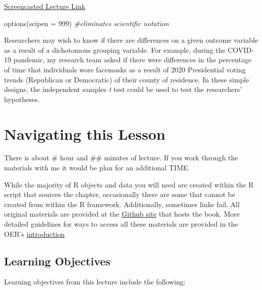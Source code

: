 \documentclass[
  11pt,
]{book}
\newenvironment{Shaded}{\begin{snugshade}}{\end{snugshade}}
\newcommand{\AttributeTok}[1]{\textcolor[rgb]{0.77,0.63,0.00}{#1}}
\newcommand{\CommentTok}[1]{\textcolor[rgb]{0.56,0.35,0.01}{\textit{#1}}}
\newcommand{\DecValTok}[1]{\textcolor[rgb]{0.00,0.00,0.81}{#1}}
\newcommand{\FunctionTok}[1]{\textcolor[rgb]{0.00,0.00,0.00}{#1}}
\newcommand{\NormalTok}[1]{#1}
\begin{document}
\href{link\%20here}{Screencasted Lecture Link}

\begin{Shaded}
\begin{Highlighting}[]
\FunctionTok{options}\NormalTok{(}\AttributeTok{scipen =} \DecValTok{999}\NormalTok{)  }\CommentTok{\#eliminates scientific notation}
\end{Highlighting}
\end{Shaded}

Researchers may wish to know if there are differences on a given outcome variable as a result of a dichotomous grouping variable. For example, during the COVID-19 pandemic, my research team asked if there were differences in the percentage of time that individuals wore facemasks as a result of 2020 Presidential voting trends (Republican or Democratic) of their county of residence. In these simple designs, the independent samples \emph{t} test could be used to test the researchers' hypotheses.

\hypertarget{navigating-this-lesson-3}{%
\section{Navigating this Lesson}\label{navigating-this-lesson-3}}

There is about \# hour and \#\# minutes of lecture. If you work through the materials with me it would be plan for an additional TIME.

While the majority of R objects and data you will need are created within the R script that sources the chapter, occasionally there are some that cannot be created from within the R framework. Additionally, sometimes links fail. All original materials are provided at the \href{https://github.com/lhbikos/ReCenterPsychStats}{Github site} that hosts the book. More detailed guidelines for ways to access all these materials are provided in the OER's \protect\hyperlink{ReCintro}{introduction}

\hypertarget{learning-objectives-3}{%
\subsection{Learning Objectives}\label{learning-objectives-3}}

Learning objectives from this lecture include the following:
\end{document}
